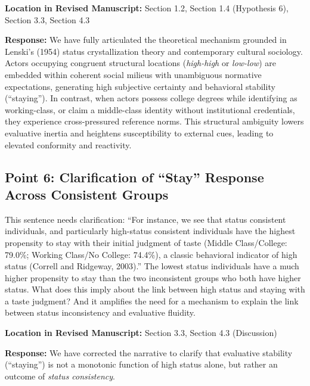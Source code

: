\documentclass[11pt, letterpaper]{article}
\begin{document}
\textbf{Location in Revised Manuscript:} Section 1.2, Section 1.4 (Hypothesis 6), Section 3.3, Section 4.3

\textbf{Response:}
We have fully articulated the theoretical mechanism grounded in Lenski's (1954) status crystallization theory and contemporary cultural sociology. Actors occupying congruent structural locations (\textit{high-high} or \textit{low-low}) are embedded within coherent social milieus with unambiguous normative expectations, generating high subjective certainty and behavioral stability (``staying''). In contrast, when actors possess college degrees while identifying as working-class, or claim a middle-class identity without institutional credentials, they experience cross-pressured reference norms. This structural ambiguity lowers evaluative inertia and heightens susceptibility to external cues, leading to elevated conformity and reactivity.

\vspace{10pt}

\subsection*{Point 6: Clarification of ``Stay'' Response Across Consistent Groups}

\begin{reviewercomment}
This sentence needs clarification: ``For instance, we see that status consistent individuals, and particularly high-status consistent individuals have the highest propensity to stay with their initial judgment of taste (Middle Class/College: 79.0\%; Working Class/No College: 74.4\%), a classic behavioral indicator of high status (Correll and Ridgeway, 2003).'' The lowest status individuals have a much higher propensity to stay than the two inconsistent groups who both have higher status. What does this imply about the link between high status and staying with a taste judgment? And it amplifies the need for a mechanism to explain the link between status inconsistency and evaluative fluidity.
\end{reviewercomment}

\textbf{Location in Revised Manuscript:} Section 3.3, Section 4.3 (Discussion)

\textbf{Response:}
We have corrected the narrative to clarify that evaluative stability (``staying'') is not a monotonic function of high status alone, but rather an outcome of \textit{status consistency}. 

\vspace{10pt}
\end{document}

